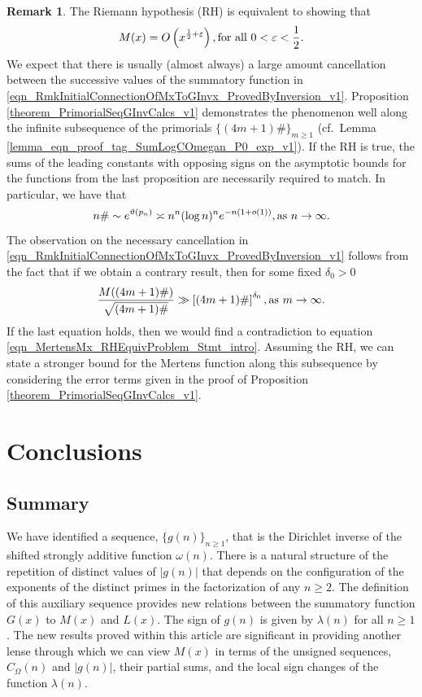 \documentclass[11pt,reqno,a4letter]{article}
\newcommand{\hlocalref}[1]{\hyperref[#1]{\ref{#1}}}
\numberwithin{equation}{section}
\numberwithin{figure}{section}
\numberwithin{table}{section}
\newcommand{\cf}{cf.~}
\theoremstyle{plain}
\numberwithin{theorem}{section}
\theoremstyle{definition}
\newtheorem{remark}[theorem]{Remark}
\theoremstyle{remark}
\newcommand{\mathtext}[1]{\text{\rm #1}}
\begin{document}
\begin{remark}
\label{remark_LocalCancellationWithGxAlongThePrimorialsUnderTheRH} 
The Riemann hypothesis (RH) is equivalent to showing that 
\begin{equation} 
\label{eqn_MertensMx_RHEquivProblem_Stmt_intro} 
M(x) = O\left(x^{\frac{1}{2}+\varepsilon}\right), \mathtext{ for all } 0 < \varepsilon < \frac{1}{2}.
\end{equation}
We expect that there is usually (almost always) 
a large amount cancellation between the successive 
values of the summatory function in 
\eqref{eqn_RmkInitialConnectionOfMxToGInvx_ProvedByInversion_v1}. 
Proposition \hlocalref{theorem_PrimorialSeqGInvCalcs_v1} 
demonstrates the phenomenon well along the infinite 
subsequence of the primorials $\{(4m+1)\#\}_{m \geq 1}$ 
(\cf Lemma \hlocalref{lemma_eqn_proof_tag_SumLogCOmegan_P0_exp_v1}). 
If the RH is true, the sums of the leading constants with opposing signs 
on the asymptotic bounds for the functions from the last proposition 
are necessarily required to match. 
In particular, we have that 
\cite{DUSART-1999,DUSART-2010} 
\[
n\# \sim e^{\vartheta(p_n)} \asymp n^n (\log n)^n e^{-n(1+o(1))}, 
     \mathtext{ as } n \rightarrow \infty. 
\]
The observation on the necessary cancellation in 
\eqref{eqn_RmkInitialConnectionOfMxToGInvx_ProvedByInversion_v1}
follows from the fact that if we obtain a contrary result, 
then for some fixed $\delta_0 > 0$
\[
\frac{M((4m+1)\#)}{\sqrt{(4m+1)\#}} \gg \left[(4m+1)\#\right]^{\delta_0}, 
     \mathtext{ as } m \rightarrow \infty. 
\]
If the last equation holds, then we would find a contradiction to 
equation \eqref{eqn_MertensMx_RHEquivProblem_Stmt_intro}. 
Assuming the RH, we can state a stronger bound for the 
Mertens function along this subsequence by considering the 
error terms given in the proof of 
Proposition \hlocalref{theorem_PrimorialSeqGInvCalcs_v1}. 
\end{remark}

\section{Conclusions}

\subsection{Summary}

We have identified a sequence, 
$\{g(n)\}_{n \geq 1}$, that is the Dirichlet inverse of the 
shifted strongly additive function $\omega(n)$. 
There is a natural structure of the repetition of distinct values 
of $|g(n)|$ that depends on the configuration of the 
exponents of the distinct primes in the factorization of any $n \geq 2$. 
The definition of this auxiliary sequence provides new relations between the 
summatory function $G(x)$ to $M(x)$ and $L(x)$. 
The sign of $g(n)$ is given by $\lambda(n)$ for all $n \geq 1$. 
The new results proved within this article 
are significant in providing another lense through which we can view $M(x)$ 
in terms of the unsigned sequences, $C_{\Omega}(n)$ and $|g(n)|$, 
their partial sums, and the local sign changes of the function $\lambda(n)$. 
\end{document}

